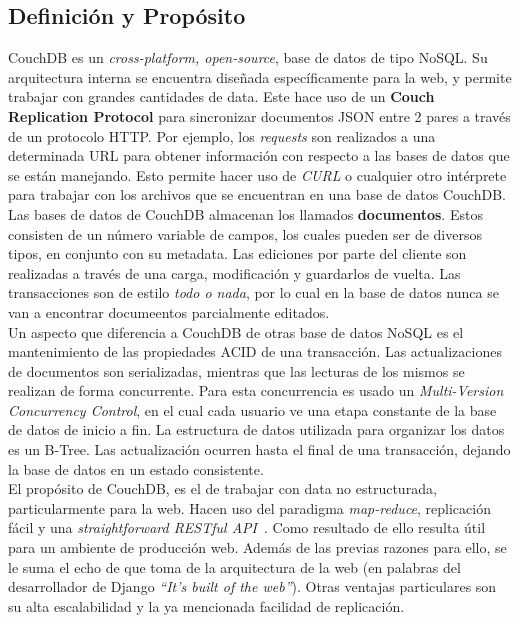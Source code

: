 \documentclass{article}
\begin{document}
        \subsection{Definición y Propósito}
            CouchDB es un \textit{cross-platform, open-source}, base de datos de tipo NoSQL. Su arquitectura interna se encuentra diseñada específicamente para la web, y permite trabajar con grandes cantidades de data. Este hace uso de un \textbf{Couch Replication Protocol} para sincronizar documentos JSON entre 2 pares a través de un protocolo HTTP. Por ejemplo, los \textit{requests} son realizados a una determinada URL para obtener información con respecto a las bases de datos que se están manejando. Esto permite hacer uso de \textit{CURL} o cualquier otro intérprete para trabajar con los archivos que se encuentran en una base de datos CouchDB. \\
            Las bases de datos de CouchDB almacenan los llamados \textbf{documentos}. Estos consisten de un número variable de campos, los cuales pueden ser de diversos tipos, en conjunto con su metadata. Las ediciones por parte del cliente son realizadas a través de una carga, modificación y guardarlos de vuelta. Las transacciones son de estilo \textit{todo o nada}, por lo cual en la base de datos nunca se van a encontrar documeentos parcialmente editados. \\
            Un aspecto que diferencia a CouchDB de otras base de datos NoSQL es el mantenimiento de las propiedades ACID de una transacción. Las actualizaciones de documentos son serializadas, mientras que las lecturas de los mismos se realizan de forma concurrente. Para esta concurrencia es usado un \textit{Multi-Version Concurrency Control}, en el cual cada usuario ve una etapa constante de la base de datos de inicio a fin. La estructura de datos utilizada para organizar los datos es un B-Tree. Las actualización ocurren hasta el final de una transacción, dejando la base de datos en un estado consistente. \\
            El propósito de CouchDB, es el de trabajar con data no estructurada, particularmente para la web. Hacen uso del paradigma \textit{map-reduce}, replicación fácil y una \textit{straightforward RESTful API} \cite{lerner}. Como resultado de ello resulta útil para un ambiente de producción web. Además de las previas razones para ello, se le suma el echo de que toma de la arquitectura de la web (en palabras del desarrollador de Django \textit{``It's built of the web''}). Otras ventajas particulares son su alta escalabilidad y la ya mencionada facilidad de replicación. 
\end{document}
